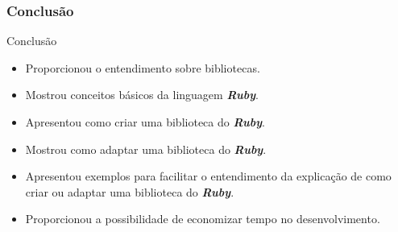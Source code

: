 \begin{frame}
 \frametitle{Conclusão}

  \begin{block}{Conclusão}
   
   \begin{itemize}
   
    \item Proporcionou o entendimento sobre bibliotecas.
    
    \item Mostrou conceitos básicos da linguagem \emph{\textbf{Ruby}}.
    
    \item Apresentou como criar uma biblioteca do \emph{\textbf{Ruby}}.
    
    \item Mostrou como adaptar uma biblioteca do \emph{\textbf{Ruby}}.
    
    \item Apresentou exemplos para facilitar o entendimento da explicação de como criar ou adaptar uma
    biblioteca do \emph{\textbf{Ruby}}.
    
    \item Proporcionou a possibilidade de economizar tempo no desenvolvimento.
    
   \end{itemize}      
   
  \end{block}
  
\end{frame}  